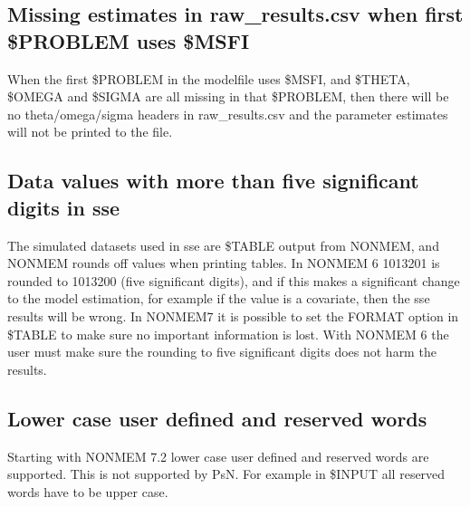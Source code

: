 \subsection{Missing estimates in raw\_results.csv when first \$PROBLEM uses \$MSFI}
When the first \$PROBLEM in the modelfile uses \$MSFI, and \$THETA, \$OMEGA and \$SIGMA are all missing in that \$PROBLEM, then there will be no theta/omega/sigma headers in raw\_results.csv and the parameter estimates will not be printed to the file.

\subsection{Data values with more than five significant digits in sse}
The simulated datasets used in sse are \$TABLE output from NONMEM, and NONMEM rounds off values when printing tables. In NONMEM 6 1013201 is rounded to 1013200 (five significant digits), and if this makes a significant change to the model estimation, for example if the value is a covariate, then the sse results will be wrong. In NONMEM7 it is possible to set the FORMAT option in \$TABLE to make sure no important information is lost. With NONMEM 6 the user must make sure the rounding to five significant digits does not harm the results.

\subsection{Lower case user defined and reserved words}
Starting with NONMEM 7.2 lower case user defined and reserved words are supported. This is not supported
by PsN. For example in \$INPUT all reserved words have to be upper case.


